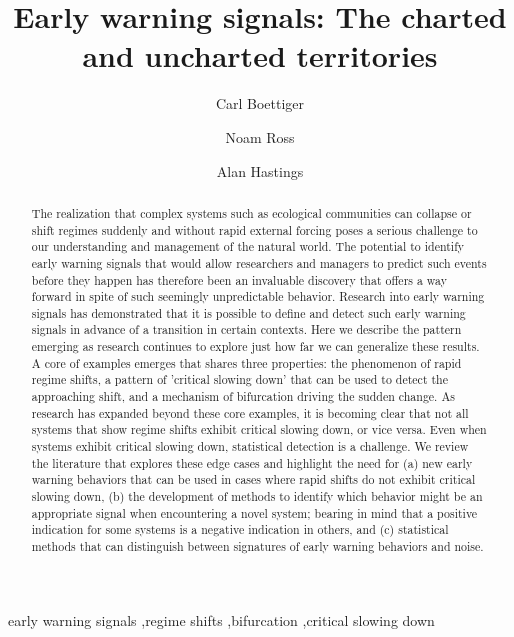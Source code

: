 \documentclass[author-year, review]{elsarticle} %
\begin{document}
\begin{frontmatter}
  \title{Early warning signals: The charted and uncharted territories}
  \author[cstar]{Carl Boettiger}
  \author[esp]{Noam Ross}
  \author[esp]{Alan Hastings}
  \address[cstar]{Center for Stock Assessment Research, Department of Applied Math and Statistics, University of California, Mail Stop SOE-2, Santa Cruz, CA 95064, USA}
  \address[esp]{Department of Environmental Science and Policy, University of California Davis, 1 Shields Avenue, Davis, CA 95616 USA}

  \begin{abstract}

The realization that complex systems such as ecological communities can collapse or shift regimes suddenly and without rapid external forcing poses a serious challenge to our understanding and management of the natural world.  The potential to identify early warning signals that would allow researchers and managers to predict such events before they happen has therefore been an invaluable discovery that offers a way forward in spite of such seemingly unpredictable behavior.  Research into early warning signals has demonstrated that it is possible to define and detect such early warning signals in advance of a transition in certain contexts.  Here we describe the pattern emerging as research continues to explore just how far we can generalize these results.  A core of examples emerges that shares three properties: the phenomenon of rapid regime shifts,  a pattern of 'critical slowing down' that can be used to detect the approaching shift, and a mechanism of bifurcation driving the sudden change.  As research has expanded beyond these core examples, it is becoming clear that not all systems that show regime shifts exhibit critical slowing down, or vice versa.  Even when systems exhibit critical slowing down, statistical detection is a challenge.  We review the literature that explores these edge cases and highlight the need for (a) new early warning behaviors that can be used in cases where rapid shifts do not exhibit critical slowing down, (b) the development of methods to identify which behavior might be an appropriate signal when encountering a novel system; bearing in mind that a positive indication for some systems is a negative indication in others, and (c) statistical methods that can distinguish between signatures of early warning behaviors and noise.
  \end{abstract}
  \begin{keyword}
early warning signals \sep regime shifts \sep bifurcation \sep critical slowing down 
   \end{keyword}

 \end{frontmatter}
\end{document}
